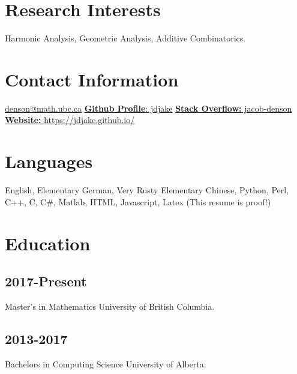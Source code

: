 \documentclass{friggeri-cv}
\newenvironment{changemargin}[2]{%
\begin{list}{}{%
\setlength{\topsep}{0pt}%
\setlength{\leftmargin}{#1}%
\setlength{\rightmargin}{#2}%
\setlength{\listparindent}{\parindent}%
\setlength{\itemindent}{\parindent}%
\setlength{\parsep}{\parskip}%
}%
\item[]}{\end{list}}
\begin{document}


\begin{aside} %
\section{Research Interests}
Harmonic Analysis, Geometric Analysis, Additive Combinatorics.
\section{Contact Information}
\href{mailto:denson@math.ubc.ca}{denson@math.ubc.ca} 
\href{https://github.com/jdjake}{{\bf Github Profile}: jdjake} 
\href{http://stackoverflow.com/users/2601483/jacob-denson}{{\bf Stack Overflow:} jacob-denson} 
\href{https://jdjake.github.io/}{{\bf Website:} https://jdjake.github.io/}
\section{Languages}
English, Elementary German, Very Rusty Elementary Chinese, Python, Perl, C++, C, C\#, Matlab, HTML, Javascript, Latex
(This resume is proof!)
\section{Education}
\subsection{2017-Present}
Master's in Mathematics
University of British Columbia.
\subsection{2013-2017}
Bachelors in Computing Science
University of Alberta.
\end{aside}


\end{document}
